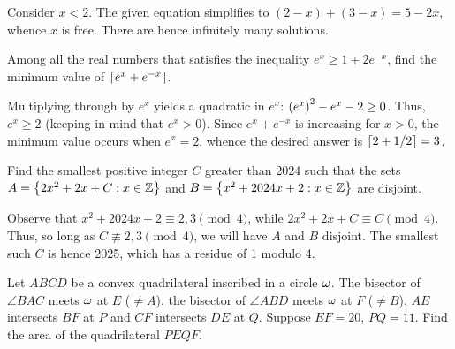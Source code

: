 Consider $x < 2$. The given equation simplifies to $(2-x) + (3-x) = 5 - 2x$, whence $x$ is free. There are hence infinitely many solutions.

\clearpage
\begin{question}[3]\label{A::2024-O-1-5}
    Among all the real numbers that satisfies the inequality $e^x \geq 1 + 2e^{-x}$, find the minimum value of $\left\lceil e^x + e^{-x} \right\rceil$.
\end{question}

Multiplying through by $e^x$ yields a quadratic in $e^x$: $\left( e^x \right)^2 - e^x - 2 \geq 0$. Thus, $e^x \geq 2$ (keeping in mind that $e^x > 0$). Since $e^x + e^{-x}$ is increasing for $x > 0$, the minimum value occurs when $e^x = 2$, whence the desired answer is $\left\lceil 2 + 1/2 \right\rceil = 3$.

\begin{question}[2025]\label{A::2024-O-1-6}
    Find the smallest positive integer $C$ greater than 2024 such that the sets $A = \left\lbrace 2x^2 + 2x + C : x \in \mathbb{Z} \right\rbrace$ and $B = \left\lbrace x^2 + 2024x + 2: x \in \mathbb{Z} \right\rbrace$ are disjoint.
\end{question}

Observe that $x^2 + 2024x + 2 \equiv 2, 3 \pmod{4}$, while $2x^2 + 2x + C \equiv C \pmod{4}$. Thus, so long as $C \not\equiv 2, 3 \pmod{4}$, we will have $A$ and $B$ disjoint. The smallest such $C$ is hence 2025, which has a residue of 1 modulo 4.

\begin{question}[110]\label{A::2024-O-1-7}
    Let $ABCD$ be a convex quadrilateral inscribed in a circle $\omega$. The bisector of $\angle BAC$ meets $\omega$ at $E$ ($\neq A$), the bisector of $\angle ABD$ meets $\omega$ at $F$ ($\neq B$), $AE$ intersects $BF$ at $P$ and $CF$ intersects $DE$ at $Q$. Suppose $EF = 20$, $PQ = 11$. Find the area of the quadrilateral $PEQF$.
\end{question}

